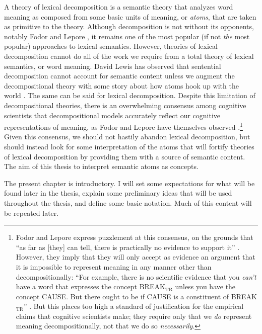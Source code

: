 A theory of lexical decomposition is a semantic theory that analyzes word meaning as composed from some basic units of meaning, or \emph{atoms}, that are taken as primitive to the theory. Although decomposition is not without its opponents, notably Fodor and Lepore \cite{fodor_emptiness_1998} \cite{fodor_morphemes_2000} \cite{fodor_impossible_1999} \cite{fodor_impossible_2005}, it remains one of the most popular (if not \emph{the} most popular) approaches to lexical semantics. However, theories of lexical decomposition cannot do all of the work we require from a total theory of lexical semantics, or word meaning. David Lewis has observed that sentential decomposition cannot account for semantic content unless we augment the decompositional theory with some story about how atoms hook up with the world \cite{lewis_general_1970}. The same can be said for lexical decomposition. Despite this limitation of decompositional theories, there is an overwhelming consensus among cognitive scientists that decompositional models accurately reflect our cognitive representations of meaning, as Fodor and Lepore have themselves observed \cite{fodor_impossible_2005}.\footnote{Fodor and Lepore express puzzlement at this consensus, on the grounds that ``as far as [they] can tell, there is practically no evidence to support it'' \cite[pg.\ 1]{fodor_impossible_2005}. However, they imply that they will only accept as evidence an argument that it is impossible to represent meaning in any manner other than decompositionally: ``For example, there is no scientific evidence that you \emph{can't} have a word that expresses the concept BREAK$_\text{TR}$ unless you have the concept CAUSE. But there ought to be if CAUSE is a constituent of BREAK$_\text{TR}$'' \cite[pg.\ 1, emphasis added]{fodor_impossible_2005}. But this places too high a standard of justification for the empirical claims that cognitive scientists make; they require only that we \emph{do} represent meaning decompositionally, not that we do so \emph{necessarily}.} Given this consensus, we should not hastily abandon lexical decomposition, but should instead look for some interpretation of the atoms that will fortify theories of lexical decomposition by providing them with a source of semantic content. The aim of this thesis to interpret semantic atoms as concepts.

The present chapter is introductory. I will set some expectations for what will be found later in the thesis, explain some preliminary ideas that will be used throughout the thesis, and define some basic notation. Much of this content will be repeated later.

